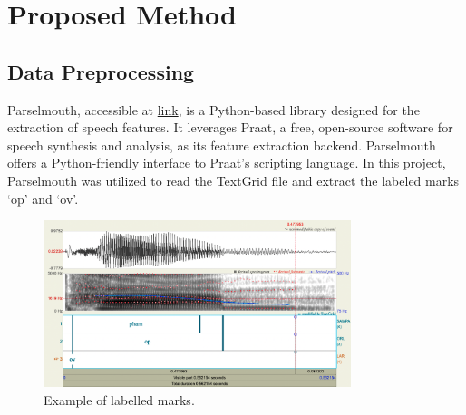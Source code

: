 \documentclass{article}
\begin{document}
\section{Proposed Method}
\subsection{Data Preprocessing}
\begin{sloppypar}
    Parselmouth, accessible at \href{https://parselmouth.readthedocs.io/en/stable/}{link}, is a Python-based library designed for the extraction of speech features. It leverages Praat, a free, open-source software for speech synthesis and analysis, as its feature extraction backend. Parselmouth offers a Python-friendly interface to Praat's scripting language. In this project, Parselmouth was utilized to read the TextGrid file and extract the labeled marks `op' and `ov'.
\end{sloppypar}
\begin{figure}[!htb]
    \centering
    \includegraphics[width=0.8\textwidth]{img/phoneme_example.png}
    \caption{Example of labelled marks.}
\end{figure}
\end{document}
